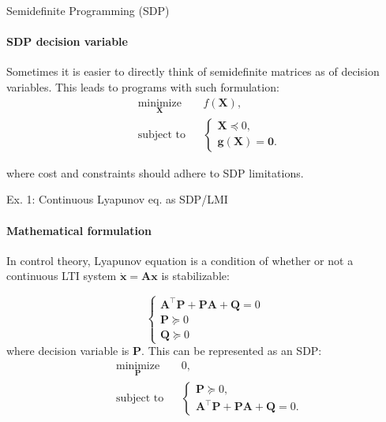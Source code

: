 \documentclass{beamer}
\begin{document}
\begin{frame}{Semidefinite Programming (SDP)}
\framesubtitle{SDP decision variable}
\begin{flushleft}

Sometimes it is easier to directly think of semidefinite matrices as of decision variables. This leads to programs with such formulation:
%
\begin{equation}
\begin{aligned}
& \underset{\mathbf{X}}{\text{minimize}}
& & f(\mathbf{X}), \\
& \text{subject to}
& & \begin{cases}
    \mathbf{X} \preceq 0, \\
    \mathbf{g}(\mathbf{X}) = \mathbf{0}.
    \end{cases}
\end{aligned}
\end{equation}

where cost and constraints should adhere to SDP limitations.

\end{flushleft}
\end{frame}



\begin{frame}{Ex. 1: Continuous Lyapunov eq. as SDP/LMI}
\framesubtitle{Mathematical formulation}
\begin{flushleft}

In control theory, Lyapunov equation is a condition of whether or not a continuous LTI system $\dot{\mathbf{x}} = \mathbf{A}\mathbf{x}$ is stabilizable:

\begin{equation}
    \begin{cases}
        \mathbf{A}^\top\mathbf{P} + \mathbf{P}\mathbf{A} + \mathbf{Q} = 0 \\
        \mathbf{P} \succeq 0 \\
        \mathbf{Q} \succeq 0 
    \end{cases}
\end{equation}
%
where decision variable is $\mathbf{P}$. This can be represented as an SDP:
%
\begin{equation}
\begin{aligned}
& \underset{\mathbf{P}}{\text{minimize}}
& & 0, \\
& \text{subject to}
& & \begin{cases}
    \mathbf{P} \succeq 0, \\
    \mathbf{A}^\top\mathbf{P} + \mathbf{P}\mathbf{A} + \mathbf{Q} = 0.
    \end{cases}
\end{aligned}
\end{equation}


\end{flushleft}
\end{frame}
\end{document}
